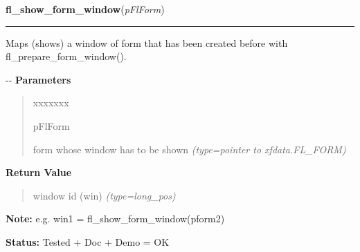     \label{xformslib:flbasic:fl_show_form_window}

    \vspace{0.5ex}

\hspace{.8\funcindent}\begin{boxedminipage}{\funcwidth}

    \raggedright \textbf{fl\_show\_form\_window}(\textit{pFlForm})

    \vspace{-1.5ex}

    \rule{\textwidth}{0.5\fboxrule}
\setlength{\parskip}{2ex}

Maps (shows) a window of form that has been created before with
fl\_prepare\_form\_window().

-{}-
\setlength{\parskip}{1ex}
      \textbf{Parameters}
      \vspace{-1ex}

      \begin{quote}
        \begin{Ventry}{xxxxxxx}

          \item[pFlForm]


form whose window has to be shown
            {\it (type=pointer to xfdata.FL\_FORM)}

        \end{Ventry}

      \end{quote}

      \textbf{Return Value}
    \vspace{-1ex}

      \begin{quote}

window id (win)
      {\it (type=long\_pos)}

      \end{quote}

\textbf{Note:} 
e.g. win1 = fl\_show\_form\_window(pform2)


\textbf{Status:} 
Tested + Doc + Demo = OK


    \end{boxedminipage}

    \label{xformslib:flbasic:fl_adjust_form_size}

